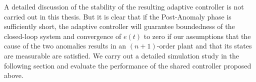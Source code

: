A detailed discussion of the stability of the resulting adaptive controller is not carried out in this thesis. But it is clear that if the Post-Anomaly phase is sufficiently short, the adaptive controller will guarantee boundedness of the closed-loop system and convergence of $e(t)$ to zero if our assumptions that the cause of the two anomalies results in an $(n+1)$-order plant and that its states are measurable are satisfied. We carry out a detailed simulation study in the following section and evaluate the performance of the shared controller proposed above.

\begin{comment}

Following this time instant, the pilot detects the anomalous vehicle dynamics, and at $t=t_{s,c}$ indicates to the adaptive autopilot the perceived increase in order. Using this pilot input, we propose an adaptive controller predicated on a third-order dynamics of the open-loop plant and assume that in addition to the bank angle and roll rate, angular acceleration $\dot{p}$ is also measurable. We choose a reference model as
\begin{equation}
	\underbrace{\begin{bmatrix}
		\dot{\phi}_d \\ \dot{p}_d \\ \ddot{p}_d
	\end{bmatrix}}_{\dot{x}_m'} = \underbrace{\begin{bmatrix}
		0 & 1 & 0\\ 0 & 0 & 1 \\ -a_{m,1}' & -a_{m,2}' & -a_{m,3}'
	\end{bmatrix}}_{A_m'} \underbrace{\begin{bmatrix}
		\phi_d \\ p_d \\ \dot{p}_d
	\end{bmatrix}}_{x_m'} + \underbrace{\begin{bmatrix}
		0 \\ 0 \\ b_{m,3}'
	\end{bmatrix}}_{B_m'} r - L_m' e'
	\label{eqn:rm_3_symbolic}
\end{equation}

The time interval $[t_{s,p}, \quad t_{s,c}]$ is indicated as Post-Anomaly and the interval $t \geq t_{s,c}$ is indicated as Post-Correction. For case (i), $\theta^* \in \mathbb{R}^3$ and $q^*$ exist that solve the corresponding matching conditions in (\ref{eqn:matchcond1}) and (\ref{eqn:matchcond2}), and an adaptive controller as in (\ref{eqn:thetadot_projection}) and (\ref{eqn:qdot_projection}) can be realized to lead to a stable closed-loop solutions and accurate tracking. These matching conditions are not met, however, in case (ii). In the numerical examples, we will discuss the details of how such an adaptive controller with an increase in dimension following the pilot input performs for both cases of anomalies. 


\end{comment}

